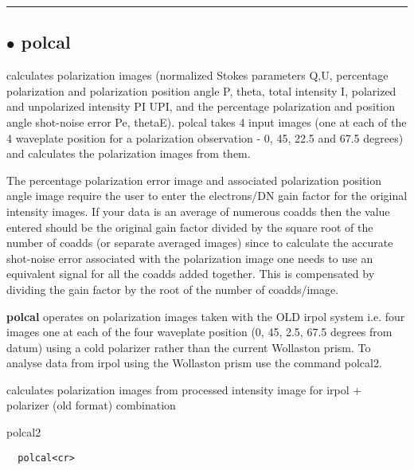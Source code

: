 \hrule \subsection*{$\bullet$ polcal}
\begin{description}
\item[Description :] calculates polarization images (normalized Stokes parameters
Q,U, percentage polarization and polarization position angle P, theta,
total intensity I, polarized and unpolarized intensity PI UPI, and the
percentage polarization and position angle shot-noise error Pe, thetaE).
polcal takes 4 input images (one at each of the 4 waveplate position for
a polarization observation - 0, 45, 22.5 and 67.5 degrees) and calculates
the polarization images from them.
\item The percentage polarization error image and associated polarization
position angle image require the user to enter the electrons/DN gain
factor for the original intensity images.  If your data is an average of
numerous coadds then the value entered should be the original gain factor
divided by the square root of the number of coadds (or separate averaged
images) since to calculate the accurate shot-noise error associated with
the polarization image one needs to use an equivalent signal for all the
coadds added together.  This is compensated by dividing the gain factor
by the root of the number of coadds/image.

{\bf polcal} operates on polarization images taken with the OLD irpol system
i.e. four images one at each of the four waveplate position (0, 45, 2.5,
67.5 degrees from datum) using a cold polarizer rather than the current
Wollaston prism.  To analyse data from irpol using the Wollaston prism
use the command polcal2.
\item[Usage :] calculates polarization images from processed intensity image
for irpol + polarizer (old format) combination
\item[Associated commands :] polcal2
\item[Invocation :]

\verb+  polcal<cr> +\end{description}

